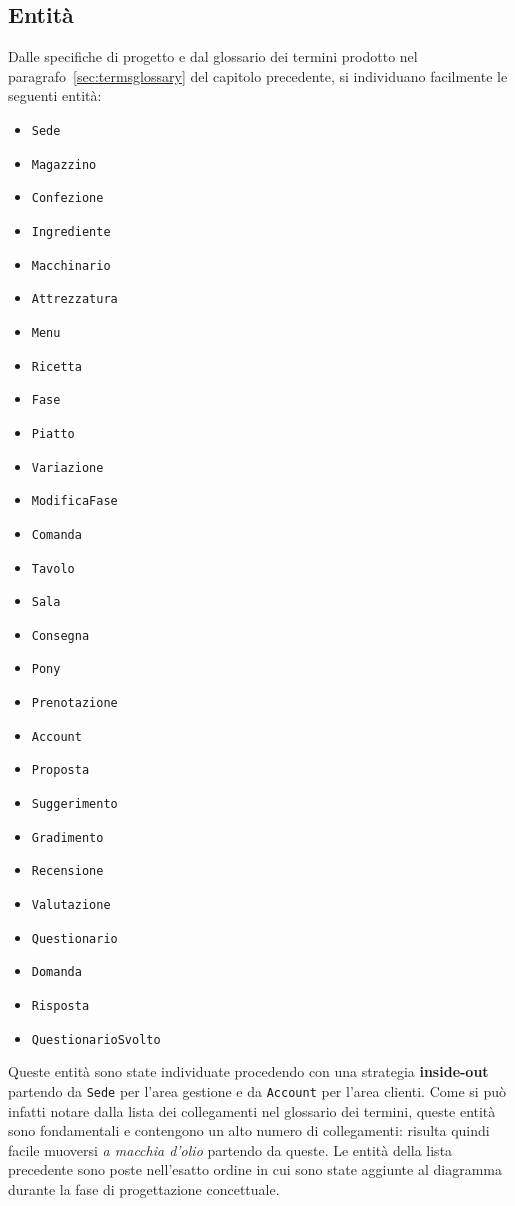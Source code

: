 \subsection{Entità}
Dalle specifiche di progetto e dal glossario dei termini prodotto nel
paragrafo~\vref{sec:termsglossary} del capitolo precedente, si individuano facilmente
le seguenti entità:
\begin{multicols}{3}
\begin{itemize}
    \item\tt Sede
    \item\tt Magazzino
    \item\tt Confezione
    \item\tt Ingrediente
    \item\tt Macchinario
    \item\tt Attrezzatura
    \item\tt Menu
    \item\tt Ricetta
    \item\tt Fase
    \item\tt Piatto
    \item\tt Variazione
    \item\tt ModificaFase
    \item\tt Comanda
    \item\tt Tavolo
    \item\tt Sala
    \item\tt Consegna
    \item\tt Pony
    \item\tt Prenotazione
\end{itemize}
\begin{itemize}
    \item\tt Account
    \item\tt Proposta
    \item\tt Suggerimento
    \item\tt Gradimento
    \item\tt Recensione
    \item\tt Valutazione
    \item\tt Questionario
    \item\tt Domanda
    \item\tt Risposta
    \item\tt QuestionarioSvolto
\end{itemize}
\end{multicols}
Queste entità sono state individuate procedendo con una strategia {\bf inside-out}
partendo da {\tt Sede} per l'area gestione e da {\tt Account} per l'area clienti. Come
si può infatti notare dalla lista dei collegamenti nel glossario dei termini, queste
entità sono fondamentali e contengono un alto numero di collegamenti: risulta quindi
facile muoversi {\it a macchia d'olio} partendo da queste.
Le entità della lista precedente sono poste nell'esatto ordine in cui sono state
aggiunte al diagramma durante la fase di progettazione concettuale.
